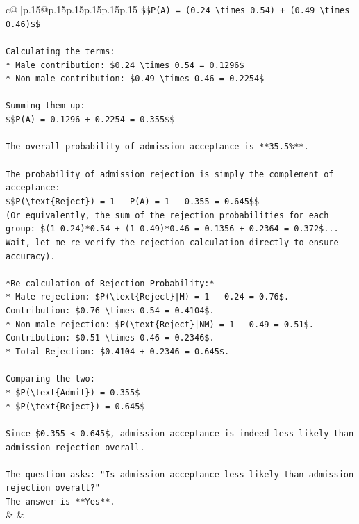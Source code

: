 \documentclass{article}
\begin{document}
{\begin{supertabular}{c@{$\;$}|p{.15\linewidth}@{}p{.15\linewidth}p{.15\linewidth}p{.15\linewidth}p{.15\linewidth}p{.15\linewidth}}
{{{\texttt{\$\$P(A) = (0.24 \textbackslash{}times 0.54) + (0.49 \textbackslash{}times 0.46)\$\$} \\
\\ 
\texttt{Calculating the terms:} \\
\texttt{*   Male contribution: \$0.24 \textbackslash{}times 0.54 = 0.1296\$} \\
\texttt{*   Non{-}male contribution: \$0.49 \textbackslash{}times 0.46 = 0.2254\$} \\
\\ 
\texttt{Summing them up:} \\
\texttt{\$\$P(A) = 0.1296 + 0.2254 = 0.355\$\$} \\
\\ 
\texttt{The overall probability of admission acceptance is **35.5\%**.} \\
\\ 
\texttt{The probability of admission rejection is simply the complement of acceptance:} \\
\texttt{\$\$P(\textbackslash{}text\{Reject\}) = 1 {-} P(A) = 1 {-} 0.355 = 0.645\$\$} \\
\texttt{(Or equivalently, the sum of the rejection probabilities for each group: \$(1{-}0.24)*0.54 + (1{-}0.49)*0.46 = 0.1356 + 0.2364 = 0.372\$... Wait, let me re{-}verify the rejection calculation directly to ensure accuracy).} \\
\\ 
\texttt{*Re{-}calculation of Rejection Probability:*} \\
\texttt{*   Male rejection: \$P(\textbackslash{}text\{Reject\}|M) = 1 {-} 0.24 = 0.76\$. Contribution: \$0.76 \textbackslash{}times 0.54 = 0.4104\$.} \\
\texttt{*   Non{-}male rejection: \$P(\textbackslash{}text\{Reject\}|NM) = 1 {-} 0.49 = 0.51\$. Contribution: \$0.51 \textbackslash{}times 0.46 = 0.2346\$.} \\
\texttt{*   Total Rejection: \$0.4104 + 0.2346 = 0.645\$.} \\
\\ 
\texttt{Comparing the two:} \\
\texttt{*   \$P(\textbackslash{}text\{Admit\}) = 0.355\$} \\
\texttt{*   \$P(\textbackslash{}text\{Reject\}) = 0.645\$} \\
\\ 
\texttt{Since \$0.355 < 0.645\$, admission acceptance is indeed less likely than admission rejection overall.} \\
\\ 
\texttt{The question asks: "Is admission acceptance less likely than admission rejection overall?"} \\
\texttt{The answer is **Yes**.} \\
            }
        }
    }
    & & \\ \\


\end{supertabular}}
\end{document}
